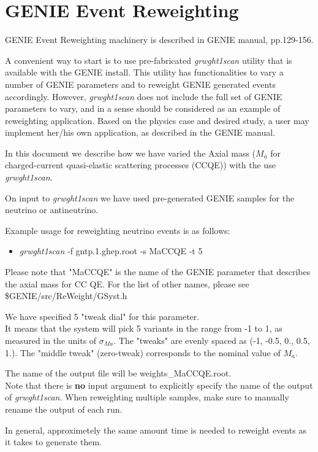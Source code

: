 \section{GENIE Event Reweighting}

GENIE Event Reweighting machinery is described in GENIE manual\cite{geniemanual}, pp.129-156.

A convenient way to start is to use pre-fabricated {\it grwght1scan} utility that is available with 
the GENIE install. This utility has functionalities to vary a number of GENIE parameters and to reweight
GENIE generated events accordingly.
However, {\it grwght1scan} does not include the full set of GENIE parameters to vary, and in a sense
should be considered as an example of reweighting application.
Based on the physics case and desired study, a user may implement her/his own application, as described 
in the GENIE manual\cite{geniemanual}.

In this document we describe how we have varied the Axial mass ($M_{a}$ for charged-current quasi-elastic 
scattering processes (CCQE)) with the use {\it grwght1scan}.

On input to {\it grwght1scan} we have used pre-generated GENIE samples for the neutrino or antineutrino.

Example usage for reweighting neutrino events is as follows:
\begin{itemize}
\item { {\it grwght1scan } -f gntp.1.ghep.root -s MaCCQE -t 5}
\end{itemize}

Please note that "MaCCQE" is the name of the GENIE parameter that describes the axial mass for CC QE.
For the list of other names, please see \$GENIE/src/ReWeight/GSyst.h 

We have specified 5 "tweak dial" for this parameter. \\
It means that the system will pick 5 variants in the range from -1 to 1, as measured in the units of $\sigma_{Ma}$. 
The "tweaks" are evenly spaced as (-1, -0.5, 0., 0.5, 1.).
The "middle tweak" (zero-tweak) corresponds to the nominal value of $M_{a}$.

The name of the output file will be weights\_MaCCQE.root. \\
Note that there is { \bf no } input argument to explicitly specify the name of the output of {\it grwght1scan}. 
When reweighting multiple samples, make sure to manually rename the output of each run.

In general, approximetely the same amount time is needed to reweight events as it takes to generate them.

